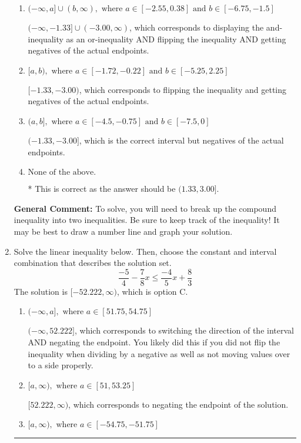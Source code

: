 \documentclass{extbook}[14pt]
\newcommand{\litem}[1]{\item #1

\rule{\textwidth}{0.4pt}}
\begin{document}
\begin{enumerate}
{\begin{enumerate}[label=\Alph*.]
$(-\infty, -1.33) \cup [-3.00, \infty)$, which corresponds to displaying the and-inequality as an or-inequality and getting negatives of the actual endpoints.
\item \( (-\infty, a] \cup (b, \infty), \text{ where } a \in [-2.55, 0.38] \text{ and } b \in [-6.75, -1.5] \)

$(-\infty, -1.33] \cup (-3.00, \infty)$, which corresponds to displaying the and-inequality as an or-inequality AND flipping the inequality AND getting negatives of the actual endpoints.
\item \( [a, b), \text{ where } a \in [-1.72, -0.22] \text{ and } b \in [-5.25, 2.25] \)

$[-1.33, -3.00)$, which corresponds to flipping the inequality and getting negatives of the actual endpoints.
\item \( (a, b], \text{ where } a \in [-4.5, -0.75] \text{ and } b \in [-7.5, 0] \)

$(-1.33, -3.00]$, which is the correct interval but negatives of the actual endpoints.
\item \( \text{None of the above.} \)

* This is correct as the answer should be $(1.33, 3.00]$.
\end{enumerate}

\textbf{General Comment:} To solve, you will need to break up the compound inequality into two inequalities. Be sure to keep track of the inequality! It may be best to draw a number line and graph your solution.
}
\litem{
Solve the linear inequality below. Then, choose the constant and interval combination that describes the solution set.
\[ \frac{-5}{4} - \frac{7}{8} x \leq \frac{-4}{5} x + \frac{8}{3} \]The solution is \( [-52.222, \infty) \), which is option C.\begin{enumerate}[label=\Alph*.]
\item \( (-\infty, a], \text{ where } a \in [51.75, 54.75] \)

 $(-\infty, 52.222]$, which corresponds to switching the direction of the interval AND negating the endpoint. You likely did this if you did not flip the inequality when dividing by a negative as well as not moving values over to a side properly.
\item \( [a, \infty), \text{ where } a \in [51, 53.25] \)

 $[52.222, \infty)$, which corresponds to negating the endpoint of the solution.
\item \( [a, \infty), \text{ where } a \in [-54.75, -51.75] \)


\end{enumerate}}
\end{enumerate}
\end{document}
